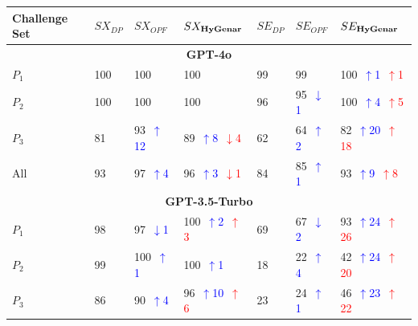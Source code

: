 \begin{table}
\centering
\begin{tabularx}{\textwidth}{l X X X X X X}
\toprule
\textbf{Challenge Set} & \textbf{$SX_{DP}$} & \textbf{$SX_{OPF}$} & \textbf{$SX_{\textbf{HyGenar}}$} & \textbf{$SE_{DP}$} & \textbf{$SE_{OPF}$} & \textbf{$SE_{\textbf{HyGenar}}$} \\
\midrule
\multicolumn{7}{c}{\small\textbf{GPT-4o}} \\
\midrule
$P_1$ 
& 100 
& 100 
& 100 
& 99 
& 99
& 100~\textcolor{blue}{\scriptsize$\uparrow$1}~\textcolor{red}{\scriptsize$\uparrow$1} \\
$P_2$ 
& 100 
& 100 
& 100 
& 96 
& 95~\textcolor{blue}{\scriptsize$\downarrow$1}  
& 100~\textcolor{blue}{\scriptsize$\uparrow$4}~\textcolor{red}{\scriptsize$\uparrow$5} \\
$P_3$ 
& 81 
& 93~\textcolor{blue}{\scriptsize$\uparrow$12} 
& 89~\textcolor{blue}{\scriptsize$\uparrow$8}~\textcolor{red}{\scriptsize$\downarrow$4} 
& 62 
& 64~\textcolor{blue}{\scriptsize$\uparrow$2} 
& 82~\textcolor{blue}{\scriptsize$\uparrow$20}~\textcolor{red}{\scriptsize$\uparrow$18} \\
All 
& 93 
& 97~\textcolor{blue}{\scriptsize$\uparrow$4}   
& 96~\textcolor{blue}{\scriptsize$\uparrow$3}~\textcolor{red}{\scriptsize$\downarrow$1} 
& 84 
& 85~\textcolor{blue}{\scriptsize$\uparrow$1}   
& 93~\textcolor{blue}{\scriptsize$\uparrow$9}~\textcolor{red}{\scriptsize$\uparrow$8} \\
\midrule
\multicolumn{7}{c}{\small\textbf{GPT-3.5-Turbo}} \\
\midrule
$P_1$ 
& 98 
& 97~\textcolor{blue}{\scriptsize$\downarrow$1}   
& 100~\textcolor{blue}{\scriptsize$\uparrow$2}~\textcolor{red}{\scriptsize$\uparrow$3}
& 69 
& 67~\textcolor{blue}{\scriptsize$\downarrow$2}   
& 93~\textcolor{blue}{\scriptsize$\uparrow$24}~\textcolor{red}{\scriptsize$\uparrow$26} \\
$P_2$ 
& 99 
& 100~\textcolor{blue}{\scriptsize$\uparrow$1}   
& 100~\textcolor{blue}{\scriptsize$\uparrow$1}
& 18 
& 22~\textcolor{blue}{\scriptsize$\uparrow$4}   
& 42~\textcolor{blue}{\scriptsize$\uparrow$24}~\textcolor{red}{\scriptsize$\uparrow$20} \\
$P_3$ 
& 86 
& 90~\textcolor{blue}{\scriptsize$\uparrow$4}   
& 96~\textcolor{blue}{\scriptsize$\uparrow$10}~\textcolor{red}{\scriptsize$\uparrow$6}
& 23 
& 24~\textcolor{blue}{\scriptsize$\uparrow$1}   
& 46~\textcolor{blue}{\scriptsize$\uparrow$23}~\textcolor{red}{\scriptsize$\uparrow$22} \\

\end{tabularx}
\end{table}

